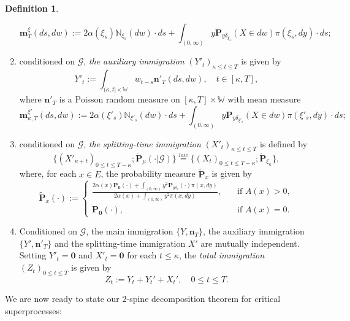 \documentclass[UTF8]{pkuthss}
\theoremstyle{plain}
\theoremstyle{definition}
\newtheorem{defi}[thm]{Definition}
\numberwithin{equation}{section}
\begin{document}
\begin{defi}
\begin{enumerate}
\[
	\mathbf m_T^\xi (ds,dw)
:=  2 \alpha(\xi_s)  \mathbb N_{\xi_s}(dw)\cdot ds
 + \int_{(0,\infty)} y \mathbf P_{y\delta_{\xi_s}}(X\in dw) \pi(\xi_s,dy)\cdot ds;
\]
\item
	conditioned on $\mathscr G$, \emph{the auxiliary immigration} $(Y'_t)_{\kappa \leq t \leq T}$ is given by
\[
	Y'_t
	:= \int_{(\kappa,t] \times \mathbb W} w_{t-s} \mathbf n'_T(ds,dw),
	\quad t \in [\kappa,T],
\]
	where $\mathbf n'_T$ is a
	Poisson random measure on $[\kappa,T] \times \mathbb W$ with mean measure
\[
	\mathbf m^{\xi'}_{\kappa,T}(ds,dw)
:=  2 \alpha(\xi'_s)  \mathbb N_{\xi'_s}(dw)\cdot ds
+  \int_{(0,\infty)} y \mathbf P_{y\delta_{\xi'_s}}(X\in dw) \pi(\xi'_s,dy)\cdot ds;
\]
\item
	conditioned on $\mathscr G$, \emph{the splitting-time immigration}
$(X'_t)_{\kappa \leq t \leq T}$ is defined by
\[
	\{(X'_{\kappa+t})_{0\leq t\leq T-\kappa}; \ddot{\mathbf P}_\mu(\cdot | \mathscr G)\}
	\overset{law}{=} \{(X_t)_{0 \leq t \leq T-\kappa}; \widetilde{\mathbf P}_{\xi_\kappa}\},
\]
where, for each $x\in E$, the probability measure $\widetilde{\mathbf P}_{x}$ is given by
\begin{equation}\label{eq:def-tilde-P}
	\widetilde{\mathbf P}_{x}(\cdot)
	:=
\begin{cases}
	\frac{2\alpha(x) \mathbf P_{\mathbf 0}(\cdot)+\int_{(0,\infty)}y^2\mathbf P_{y\delta_x}(\cdot)\pi(x,dy)}{2\alpha(x)+\int_{(0,\infty)}y^2\pi(x,dy)},
	&\quad \mbox{if } A(x)>0,\\
	\mathbf P_{\mathbf 0}(\cdot),
	&\quad \mbox{if } A(x)=0.
\end{cases}
\end{equation}
\item
	Conditioned on $\mathscr G$, the main immigration
	$\{Y,\mathbf n_T\}$, the auxiliary immigration $\{Y',\mathbf n'_T\}$ and the splitting-time immigration $X'$ are mutually independent.
	Setting $Y'_t = \mathbf 0$ and $X'_t = \mathbf 0$ for each $t\leq \kappa$, the \emph{total immigration $(Z_t)_{0\leq t\leq T}$} is given by
\[
	Z_t
	:= Y_t + Y_t' + X_t',
	\quad 0\leq t\leq T.
\]
\end{enumerate}
\end{defi}

We are now ready to state our 2-spine decomposition theorem for critical superprocesses:
\end{document}
